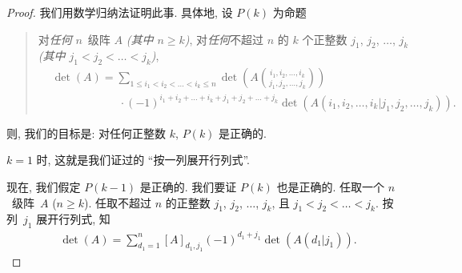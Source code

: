 \begin{proof}
    我们用数学归纳法证明此事.
    具体地, 设 \(P(k)\) 为命题
    \begin{quotation}
        对\emph{任何} \(n\)~级阵 \(A\)
        \emph{(其中 \(n \geq k\))},
        对\emph{任何}不超过 \(n\) 的 \(k\) 个正整数
        \(j_1\), \(j_2\), \(\dots\), \(j_k\)
        \emph{(其中 \(j_1 < j_2 < \dots < j_k\))},
        \begin{align*}
             &
            \det {(A)}
            = \sum_{1 \leq i_1 < i_2 < \dots < i_k \leq n}
            {\det {\left(
                    A\binom{i_1, i_2, \dots, i_k}%
                    {j_1, j_2, \dots, j_k}
                    \right)}}
            \\
             &
            \qquad \qquad \qquad
            \cdot (-1)^{i_1 + i_2 + \dots + i_k
                + j_1 + j_2 + \dots + j_k}
            \det {(A({i_1,i_2,\dots,i_k}|{j_1,j_2,\dots,j_k}))}.
        \end{align*}
    \end{quotation}
    则, 我们的目标是:
    对任何正整数 \(k\), \(P(k)\) 是正确的.

    \(k = 1\) 时, 这就是我们证过的 ``按一列展开行列式''.

    现在, 我们假定 \(P(k - 1)\) 是正确的.
    我们要证 \(P(k)\) 也是正确的.
    任取一个 \(n\)~级阵~\(A\) (\(n \geq k\)).
    任取不超过 \(n\) 的正整数
    \(j_1\), \(j_2\), \(\dots\), \(j_k\),
    且 \(j_1 < j_2 < \dots < j_k\).
    按列~\(j_1\) 展开行列式,
    知
    \begin{align*}
        \det {(A)} = \sum_{d_1 = 1}^{n}
        {[A]_{d_1,j_1}
        (-1)^{d_1 + j_1}
        \det {(A(d_1|j_1))}}.
    \end{align*}


\end{proof}
